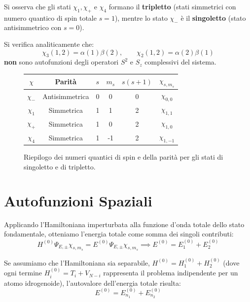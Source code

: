Si osserva che gli stati \(\chi_1, \chi_+\) e \(\chi_4\) formano il \textbf{tripletto} (stati simmetrici con numero quantico di spin totale \(s=1\)), mentre lo stato \(\chi_-\) è il \textbf{singoletto} (stato antisimmetrico con \(s=0\)).

\begin{attention}
    Si verifica analiticamente che:
    \begin{equation}
        \chi_3(1,2) = \alpha(1)\beta(2), \qquad \chi_2(1,2) = \alpha(2)\beta(1)
    \end{equation}
    \textbf{non} sono autofunzioni degli operatori \(S^2\) e \(S_z\) complessivi del sistema.
\end{attention}

\begin{figure}[H]
    \centering
    \large
    \renewcommand{\arraystretch}{1.5}
    \setlength{\tabcolsep}{12pt} 
    \begin{tabular}{|c|c|c|c|c|c|}
        \hline
        \(\chi\) & \textbf{Parità} & \(s\) & \(m_s\) & \(s(s+1)\) & \(\chi_{s, m_s}\) \\ \hline
        \(\chi_-\) & Antisimmetrica & 0 & 0 & 0 & \(\chi_{0,0}\) \\ \hline
        \(\chi_1\) & Simmetrica & 1 & 1 & 2 & \(\chi_{1,1}\) \\ \hline
        \(\chi_+\) & Simmetrica & 1 & 0 & 2 & \(\chi_{1,0}\) \\ \hline
        \(\chi_4\) & Simmetrica & 1 & -1 & 2 & \(\chi_{1,-1}\) \\ \hline
    \end{tabular}
    \caption{Riepilogo dei numeri quantici di spin e della parità per gli stati di singoletto e di tripletto.}
    \label{fig:tabella_stati_spin_larga}
\end{figure}

\section{Autofunzioni Spaziali}

Applicando l'Hamiltoniana imperturbata alla funzione d'onda totale dello stato fondamentale, otteniamo l'energia totale come somma dei singoli contributi:
\begin{equation}
    H^{(0)} \Psi_{E,\pm} \chi_{s,m_s} = E^{(0)} \Psi_{E,\pm} \chi_{s,m_s} \implies E^{(0)} = E_1^{(0)} + E_2^{(0)}
\end{equation}

Se assumiamo che l'Hamiltoniana sia separabile, \(H^{(0)} = H_1^{(0)} + H_2^{(0)}\) (dove ogni termine \(H_i^{(0)} = T_i + V_{N-i}\) rappresenta il problema indipendente per un atomo idrogenoide), l'autovalore dell'energia totale risulta:
\begin{equation}
    E^{(0)} = E_{n_1}^{(0)} + E_{n_2}^{(0)}
\end{equation}

